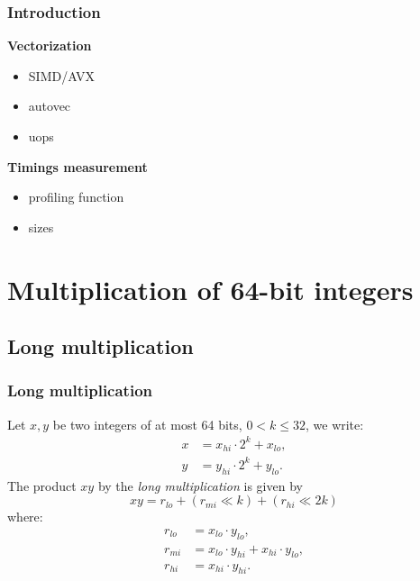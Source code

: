 \documentclass[10pt]{beamer}
\begin{document}
\begin{frame}
\begin{center}
{
        }
    \end{center}
\end{frame}

\begin{frame}
    \frametitle{Introduction}

    \textbf{Vectorization}
    \begin{itemize}
        \item SIMD/AVX
        \item autovec
        \item uops
    \end{itemize}
    
    \textbf{Timings measurement}
    \begin{itemize}
        \item profiling function
        \item sizes
    \end{itemize}
\end{frame}

\section{Multiplication of 64-bit integers}
\subsection{Long multiplication}
\begin{frame}
    \frametitle{Long multiplication}

    \begin{mybox}
        Let $x,y$ be two integers of at most 64 bits, $0 < k \leq 32$, we write:
        \begin{align*}
            x &= x_{hi} \cdot 2^k + x_{lo}, \\
            y &= y_{hi} \cdot 2^k + y_{lo}.
        \end{align*}
        The product $xy$ by the \textit{long multiplication} is given by
        $$xy = r_{lo} + (r_{mi} \ll k) + (r_{hi} \ll 2k)$$
        where:
        \begin{align*}
            r_{lo} &= x_{lo} \cdot y_{lo}, \\
            r_{mi} &= x_{lo} \cdot y_{hi} + x_{hi} \cdot y_{lo}, \\
            r_{hi} &= x_{hi} \cdot y_{hi}. 
        \end{align*}
    \end{mybox}
\end{frame}
\end{document}
